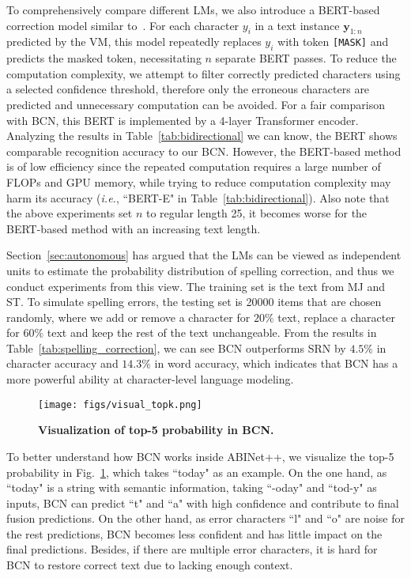 \documentclass[10pt,journal,compsoc]{IEEEtran}
\def\ie{{\it i.e.}\xspace}
\begin{document}
To comprehensively compare different LMs, we also introduce a BERT-based correction model similar to~\cite{bhunia2021joint}. For each character $y_i$ in a text instance $\bm{y}_{1:n}$ predicted by the VM, this model repeatedly replaces $y_i$ with token {\tt{[MASK]}} and predicts the masked token, necessitating $n$ separate BERT passes. To reduce the computation complexity, we attempt to filter correctly predicted characters using a selected confidence threshold, therefore only the erroneous characters are predicted and unnecessary computation can be avoided. For a fair comparison with BCN, this BERT is implemented by a 4-layer Transformer encoder. Analyzing the results in Table~\ref{tab:bidirectional} we can know, the BERT shows comparable recognition accuracy to our BCN. However, the BERT-based method is of low efficiency since the repeated computation requires a large number of FLOPs and GPU memory, while trying to reduce computation complexity may harm its accuracy (\ie, “BERT-E" in Table~\ref{tab:bidirectional}). Also note that the above experiments set $n$ to regular length 25, it becomes worse for the BERT-based method with an increasing text length.


Section~\ref{sec:autonomous} has argued that the LMs can be viewed as independent units to estimate the probability distribution of spelling correction, and thus we conduct experiments from this view. The training set is the text from MJ and ST. To simulate spelling errors, the testing set is 20000 items that are chosen randomly, where we add or remove a character for $20\%$ text, replace a character for $60\%$ text and keep the rest of the text unchangeable. From the results in Table~\ref{tab:spelling_correction}, we can see BCN outperforms SRN by $4.5\%$ in character accuracy and $14.3\%$ in word accuracy, which indicates that BCN has a more powerful ability at character-level language modeling.

\begin{figure}
   \begin{center}
      \texttt{[image: figs/visual\_topk.png]}
      \caption{\textbf{Visualization of top-5 probability in BCN.}}
      \label{fig:visual_topk}
   \end{center}
   \vspace{0em}   
\end{figure}

To better understand how BCN works inside ABINet++, we visualize the top-5 probability in Fig.~\ref{fig:visual_topk}, which takes “today" as an example. On the one hand, as ``today" is a string with semantic information, taking ``-oday" and ``tod-y" as inputs, BCN can predict ``t" and ``a" with high confidence and contribute to final fusion predictions. On the other hand, as error characters ``l" and ``o" are noise for the rest predictions, BCN becomes less confident and has little impact on the final predictions. Besides, if there are multiple error characters, it is hard for BCN to restore correct text due to lacking enough context.
\end{document}
